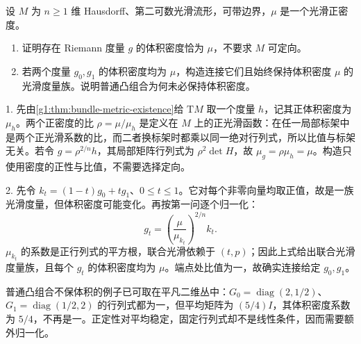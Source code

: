 \begin{exercise}
	\label{g1:ex:prescribed-positive-density}
	设 \(M\) 为 \(n\geq1\) 维 Hausdorff、第二可数光滑流形，可带边界，\(\mu\) 是一个光滑正密度。
	\begin{enumerate}
		\item 证明存在 Riemann 度量 \(g\) 的体积密度恰为 \(\mu\)，不要求 \(M\) 可定向。
		\item 若两个度量 \(g_0,g_1\) 的体积密度均为 \(\mu\)，构造连接它们且始终保持体积密度 \(\mu\) 的光滑度量族。说明普通凸组合为何未必保持体积密度。
	\end{enumerate}
\end{exercise}
\begin{solution}
	1. 先由\cref{g1:thm:bundle-metric-existence}给 \(\mathrm{T}M\) 取一个度量 \(h\)，记其正体积密度为 \(\mu_h\)。两个正密度的比 \(\rho=\mu/\mu_h\) 是定义在 \(M\) 上的正光滑函数：在任一局部标架中是两个正光滑系数的比，而二者换标架时都乘以同一绝对行列式，所以比值与标架无关。若令 \(g=\rho^{2/n}h\)，其局部矩阵行列式为 \(\rho^2\det H\)，故 \(\mu_g=\rho\mu_h=\mu\)。构造只使用密度的正性与比值，不需要选择定向。

	2. 先令 \(k_t=(1-t)g_0+tg_1\)、\(0\leq t\leq1\)。它对每个非零向量均取正值，故是一族光滑度量，但体积密度可能变化。再按第一问逐个归一化：
	\[
		g_t=\left(\frac{\mu}{\mu_{k_t}}\right)^{2/n}k_t.
	\]
	\(\mu_{k_t}\) 的系数是正行列式的平方根，联合光滑依赖于 \((t,p)\)；因此上式给出联合光滑度量族，且每个 \(g_t\) 的体积密度均为 \(\mu\)。端点处比值为一，故确实连接给定 \(g_0,g_1\)。

	普通凸组合不保体积的例子已可取在平凡二维丛中：\(G_0=\operatorname{diag}(2,1/2)\)、\(G_1=\operatorname{diag}(1/2,2)\) 的行列式都为一，但平均矩阵为 \((5/4)I\)，其体积密度系数为 \(5/4\)，不再是一。正定性对平均稳定，固定行列式却不是线性条件，因而需要额外归一化。
\end{solution}
